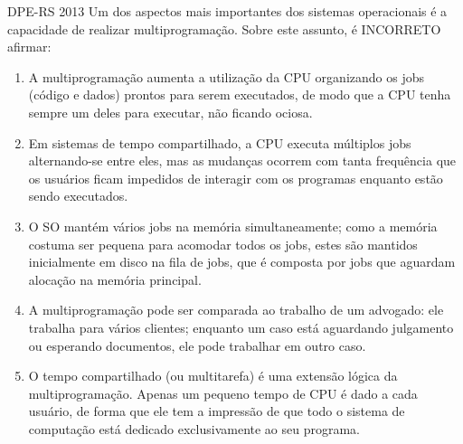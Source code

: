 \documentclass[aspectratio=169,
				xcolor=table]{beamer}
\begin{document}
	\begin{frame}{DPE-RS 2013}
		Um dos aspectos mais importantes dos sistemas operacionais é a capacidade de realizar multiprogramação. Sobre este assunto, é INCORRETO afirmar:
		\begin{enumerate}[a]
			\small
			\item A multiprogramação aumenta a utilização da CPU organizando os jobs (código e dados) prontos para serem executados, de modo que a CPU tenha sempre um deles para executar, não ficando ociosa.
			\item Em sistemas de tempo compartilhado, a CPU executa múltiplos jobs alternando-se entre eles, mas as mudanças ocorrem com tanta frequência que os usuários ficam impedidos de interagir com os programas enquanto estão sendo executados.
			\item O SO mantém vários jobs na memória simultaneamente; como a memória costuma ser pequena para acomodar todos os jobs, estes são mantidos inicialmente em disco na fila de jobs, que é composta por jobs que aguardam alocação na memória principal.
			\item A multiprogramação pode ser comparada ao trabalho de um advogado: ele trabalha para vários clientes; enquanto um caso está aguardando julgamento ou esperando documentos, ele pode trabalhar em outro caso.
			\item O tempo compartilhado (ou multitarefa) é uma extensão lógica da multiprogramação. Apenas um pequeno tempo de CPU é dado a cada usuário, de forma que ele tem a impressão de que todo o sistema de computação está dedicado exclusivamente ao seu programa.
			
		\end{enumerate}

	\end{frame}	
	
\end{document}
